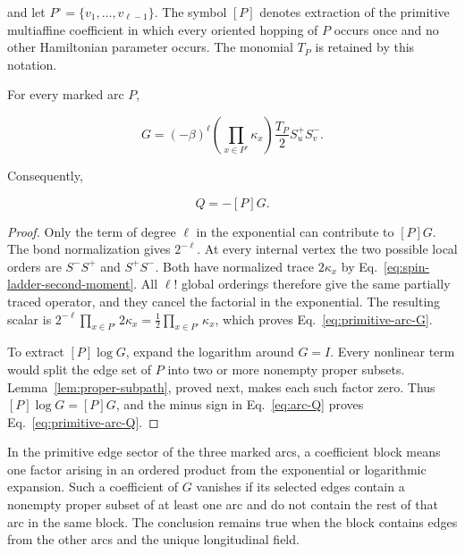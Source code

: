 and let $P^\circ=\{v_1,\ldots,v_{\ell-1}\}$.  The symbol $[P]$ denotes
extraction of the primitive multiaffine coefficient in which every oriented
hopping of $P$ occurs once and no other Hamiltonian parameter occurs.  The
monomial $T_P$ is retained by this notation.

\begin{lemma}
\label{lem:primitive-arc-jet}
For every marked arc $P$,

\begin{equation}
 [P]G
 =(-\beta)^\ell
 \left(\prod_{x\in P^\circ}\kappa_x\right)
 \frac{T_P}{2}S_u^+S_v^-.
 \label{eq:primitive-arc-G}
\end{equation}

Consequently,

\begin{equation}
 [P]Q=-[P]G.
 \label{eq:primitive-arc-Q}
\end{equation}
\end{lemma}

\begin{proof}
Only the term of degree $\ell$ in the exponential can contribute to
$[P]G$.  The bond normalization gives $2^{-\ell}$.  At every internal
vertex the two possible local orders are $S^-S^+$ and $S^+S^-$.  Both have
normalized trace $2\kappa_x$ by
Eq.~\eqref{eq:spin-ladder-second-moment}.  All $\ell!$ global orderings
therefore give the same partially traced operator, and they cancel the
factorial in the exponential.  The resulting scalar is
$2^{-\ell}\prod_{x\in P^\circ}2\kappa_x
=\frac12\prod_{x\in P^\circ}\kappa_x$, which proves
Eq.~\eqref{eq:primitive-arc-G}.

To extract $[P]\log G$, expand the logarithm around $G=I$.  Every nonlinear
term would split the edge set of $P$ into two or more nonempty proper
subsets.  Lemma~\ref{lem:proper-subpath}, proved next, makes each such factor
zero.  Thus $[P]\log G=[P]G$, and the minus sign in
Eq.~\eqref{eq:arc-Q} proves Eq.~\eqref{eq:primitive-arc-Q}.
\end{proof}

\begin{lemma}
\label{lem:proper-subpath}
In the primitive edge sector of the three marked arcs, a coefficient block
means one factor arising in an ordered product from the exponential or
logarithmic expansion.  Such a coefficient of $G$ vanishes if its selected
edges contain a nonempty proper subset of at least one arc and do not contain
the rest of that arc in the same block.  The conclusion remains true when
the block contains edges from the other arcs and the unique longitudinal
field.
\end{lemma}

